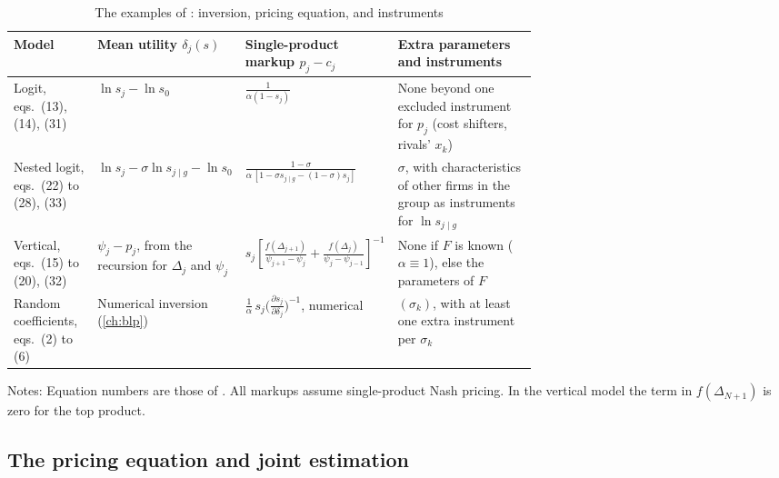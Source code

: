 \begin{table}[htbp]
\centering
\caption{The examples of \citet{Berry1994}: inversion, pricing equation, and instruments}
\label{tab:07-berry-examples}
\small
\renewcommand{\arraystretch}{1.5}
\begin{tabularx}{\linewidth}{>{\raggedright\arraybackslash}p{0.16\linewidth}
  >{\raggedright\arraybackslash}p{0.25\linewidth}
  >{\raggedright\arraybackslash}p{0.26\linewidth}
  >{\raggedright\arraybackslash}X}
\toprule
Model & Mean utility $\delta_j(s)$ & Single-product markup $p_j - c_j$ & Extra parameters and instruments \\
\midrule
Logit, eqs.\ (13), (14), (31) & $\ln s_j - \ln s_0$ & $\frac{1}{\alpha(1-s_j)}$ &
  None beyond one excluded instrument for $p_j$ (cost shifters, rivals' $x_k$) \\
Nested logit, eqs.\ (22) to (28), (33) & $\ln s_j - \sigma\ln s_{j\mid g} - \ln s_0$ &
  $\frac{1-\sigma}{\alpha\,[1 - \sigma s_{j\mid g} - (1-\sigma)s_j]}$ &
  $\sigma$, with characteristics of other firms in the group as instruments for $\ln s_{j\mid g}$ \\
Vertical, eqs.\ (15) to (20), (32) & $\psi_j - p_j$, from the recursion for $\Delta_j$ and $\psi_j$ &
  $s_j\left[\frac{f(\Delta_{j+1})}{\psi_{j+1}-\psi_j} + \frac{f(\Delta_j)}{\psi_j-\psi_{j-1}}\right]^{-1}$ &
  None if $F$ is known ($\alpha \equiv 1$), else the parameters of $F$ \\
Random coefficients, eqs.\ (2) to (6) & Numerical inversion (\cref{ch:blp}) &
  $\frac{1}{\alpha}\,s_j\big(\frac{\partial s_j}{\partial\delta_j}\big)^{-1}$, numerical &
  $(\sigma_k)$, with at least one extra instrument per $\sigma_k$ \\
\bottomrule
\end{tabularx}
\par\medskip
\parbox{\linewidth}{\footnotesize Notes: Equation numbers are those of \citet{Berry1994}. All markups assume
single-product Nash pricing. In the vertical model the term in $f(\Delta_{N+1})$ is zero for the top product.}
\end{table}

\subsection{The pricing equation and joint estimation}\label{sec:07-berry-supply}

